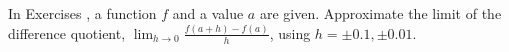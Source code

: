 {\noindent In Exercises}
{, a function $f$ and a value $a$ are given. Approximate the limit of the difference quotient, $\displaystyle \lim_{h\to 0}\frac{f(a+h)-f(a)}{h}$, using $h = \pm 0.1, \pm 0.01$.}

